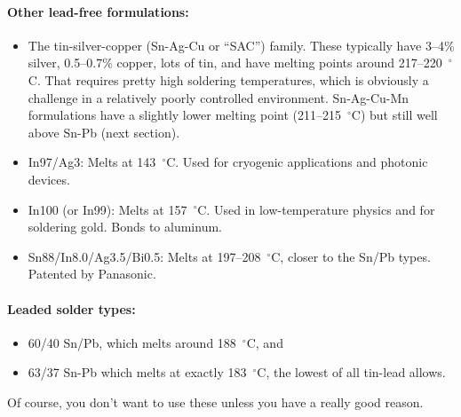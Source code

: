 \documentclass[11pt]{report}
\def\degC{$^\circ$C}
\begin{document}
\paragraph{Other lead-free formulations:}
\begin{itemize}
\item The tin-silver-copper (Sn-Ag-Cu or “SAC”) family. These
  typically have 3--4\% silver, 0.5--0.7\% copper, lots of tin, and
  have melting points around 217--220~\degC{}. That requires pretty
  high soldering temperatures, which is obviously a challenge in a
  relatively poorly controlled environment. Sn-Ag-Cu-Mn formulations
  have a slightly lower melting point (211--215~\degC{}) but still
  well above Sn-Pb (next section).
\item In97/Ag3: Melts at 143~\degC{}. Used for cryogenic applications
  and photonic devices.
\item In100 (or In99): Melts at 157~\degC{}. Used in low-temperature
  physics and for soldering gold. Bonds to aluminum.
\item Sn88/In8.0/Ag3.5/Bi0.5: Melts at 197--208~\degC{}, closer to the
  Sn/Pb types. Patented by Panasonic.
\end{itemize}

\paragraph{Leaded solder types:} 
\begin{itemize}
\item 60/40 Sn/Pb, which melts around 188~\degC{}, and
\item 63/37 Sn-Pb which melts at exactly 183~\degC{}, the lowest of
  all tin-lead allows.
\end{itemize}
Of course, you don't want to use these unless you have a really good reason.
\end{document}
